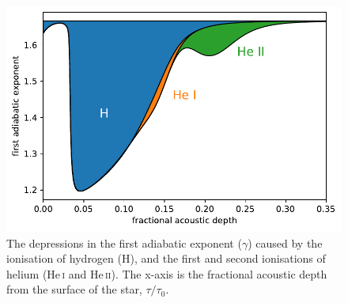 \begin{figure}
    \centering
    \includegraphics{figures/adiabatic-ionisation-regions.pdf}
    \caption{The depressions in the first adiabatic exponent (\(\gamma\)) caused by the ionisation of hydrogen (H), and the first and second ionisations of helium (He\,\textsc{i} and He\,\textsc{ii}). The x-axis is the fractional acoustic depth from the surface of the star, \(\tau/\tau_0\).}
    \label{fig:gamma-zones}
\end{figure}


